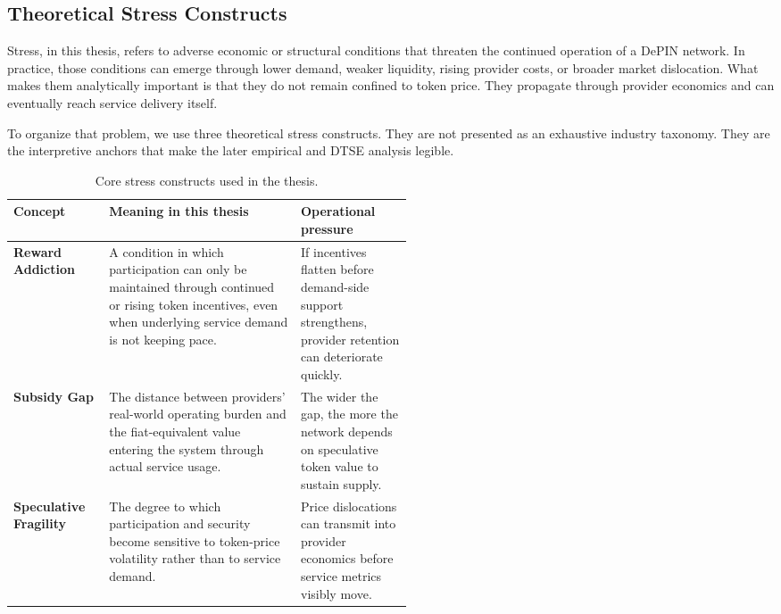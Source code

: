 \newpage
\subsection{Theoretical Stress Constructs}
Stress, in this thesis, refers to adverse economic or structural conditions that threaten the continued operation of a DePIN network. In practice, those conditions can emerge through lower demand, weaker liquidity, rising provider costs, or broader market dislocation. What makes them analytically important is that they do not remain confined to token price. They propagate through provider economics and can eventually reach service delivery itself.

To organize that problem, we use three theoretical stress constructs. They are not presented as an exhaustive industry taxonomy. They are the interpretive anchors that make the later empirical and DTSE analysis legible.

\begin{table}[H]
    \centering
    \small
    \renewcommand{\arraystretch}{1.35}
    \begin{tabularx}{\textwidth}{@{}>{\raggedright\arraybackslash}p{0.24\linewidth} X >{\raggedright\arraybackslash}p{0.28\linewidth}@{}}
        \toprule
        \textbf{Concept} & \textbf{Meaning in this thesis} & \textbf{Operational pressure} \\
        \midrule
        \textbf{Reward Addiction} & A condition in which participation can only be maintained through continued or rising token incentives, even when underlying service demand is not keeping pace. & If incentives flatten before demand-side support strengthens, provider retention can deteriorate quickly. \\
        \midrule
        \textbf{Subsidy Gap} & The distance between providers' real-world operating burden and the fiat-equivalent value entering the system through actual service usage. & The wider the gap, the more the network depends on speculative token value to sustain supply. \\
        \midrule
        \textbf{Speculative Fragility} & The degree to which participation and security become sensitive to token-price volatility rather than to service demand. & Price dislocations can transmit into provider economics before service metrics visibly move. \\
        \bottomrule
    \end{tabularx}
    \caption[Core stress constructs]{Core stress constructs used in the thesis.}
    \label{tab:v2_stress_constructs}
\end{table}

